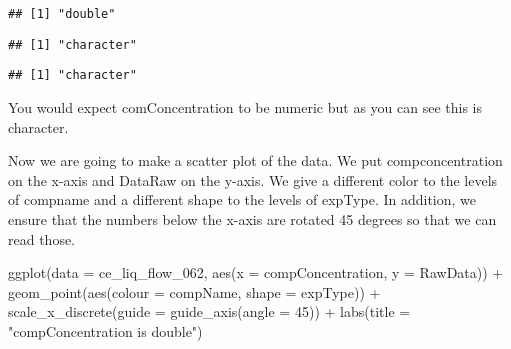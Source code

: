 \documentclass[
]{book}
\newenvironment{Shaded}{\begin{snugshade}}{\end{snugshade}}
\newcommand{\AttributeTok}[1]{\textcolor[rgb]{0.77,0.63,0.00}{#1}}
\newcommand{\DecValTok}[1]{\textcolor[rgb]{0.00,0.00,0.81}{#1}}
\newcommand{\FunctionTok}[1]{\textcolor[rgb]{0.00,0.00,0.00}{#1}}
\newcommand{\NormalTok}[1]{#1}
\newcommand{\SpecialCharTok}[1]{\textcolor[rgb]{0.00,0.00,0.00}{#1}}
\newcommand{\StringTok}[1]{\textcolor[rgb]{0.31,0.60,0.02}{#1}}
\begin{document}
\begin{verbatim}
## [1] "double"
\end{verbatim}

\begin{Shaded}
\end{Shaded}

\begin{verbatim}
## [1] "character"
\end{verbatim}

\begin{Shaded}
\end{Shaded}

\begin{verbatim}
## [1] "character"
\end{verbatim}

You would expect comConcentration to be numeric but as you can see this is character.

Now we are going to make a scatter plot of the data. We put compconcentration on the x-axis and DataRaw on the y-axis. We give a different color to the levels of compname and a different shape to the levels of expType. In addition, we ensure that the numbers below the x-axis are rotated 45 degrees so that we can read those.

\begin{Shaded}
\begin{Highlighting}[]
\FunctionTok{ggplot}\NormalTok{(}\AttributeTok{data =}\NormalTok{ ce\_liq\_flow\_062, }\FunctionTok{aes}\NormalTok{(}\AttributeTok{x =}\NormalTok{ compConcentration, }\AttributeTok{y =}\NormalTok{ RawData)) }\SpecialCharTok{+}
  \FunctionTok{geom\_point}\NormalTok{(}\FunctionTok{aes}\NormalTok{(}\AttributeTok{colour =}\NormalTok{ compName, }\AttributeTok{shape =}\NormalTok{ expType)) }\SpecialCharTok{+}
   \FunctionTok{scale\_x\_discrete}\NormalTok{(}\AttributeTok{guide =} \FunctionTok{guide\_axis}\NormalTok{(}\AttributeTok{angle =} \DecValTok{45}\NormalTok{)) }\SpecialCharTok{+}
  \FunctionTok{labs}\NormalTok{(}\AttributeTok{title =} \StringTok{"compConcentration is double"}\NormalTok{)}
\end{Highlighting}
\end{Shaded}
\end{document}
